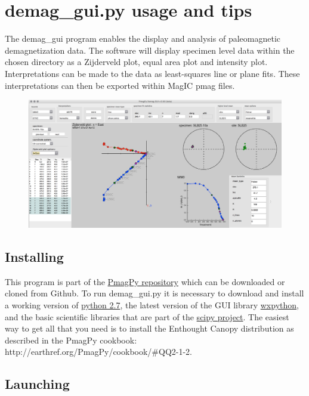 \section{demag\_gui.py usage and
tips}\label{demagux5fgui.py-usage-and-tips}

The demag\_gui program enables the display and analysis of paleomagnetic
demagnetization data. The software will display specimen level data
within the chosen directory as a Zijderveld plot, equal area plot and
intensity plot. Interpretations can be made to the data as least-squares
line or plane fits. These interpretations can then be exported within
MagIC pmag files.

\begin{figure}[htbp]
\centering
\includegraphics{./images/demag_gui.png}
\caption{}
\end{figure}

\subsection{Installing}\label{installing}

This program is part of the
\href{https://github.com/ltauxe/PmagPy}{PmagPy repository} which can be
downloaded or cloned from Github. To run demag\_gui.py it is necessary
to download and install a working version of
\href{https://www.python.org/downloads/}{python 2.7}, the latest version
of the GUI library
\href{http://www.wxpython.org/download.php}{wxpython}, and the basic
scientific libraries that are part of the
\href{http://www.scipy.org/install.html}{scipy project}. The easiest way
to get all that you need is to install the Enthought Canopy distribution
as described in the PmagPy cookbook:
http://earthref.org/PmagPy/cookbook/\#QQ2-1-2.

\subsection{Launching}\label{launching}

